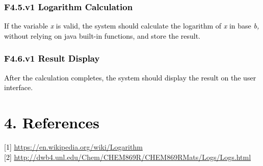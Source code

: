 \documentclass[letterpaper]{article}
\begin{document}
\subsubsection[F4.5.v1 Logarithm Calculation]{\textbf{\textcolor{black}{F4.5.v1 Logarithm Calculation}}}
\textcolor{black}{If the variable }\textit{\textcolor{black}{x}}\textcolor{black}{ is valid, the system should calculate
the logarithm of }\textit{\textcolor{black}{x}}\textcolor{black}{ in base
}\textit{\textcolor{black}{b,}}\textcolor{black}{ without relying on java built-in functions, and store the result.}

\subsubsection[F4.6.v1 Result Display]{\textbf{\textcolor{black}{F4.6.v1 Result Display}}}
\textcolor{black}{After the calculation completes, the system should display the result on the user interface.}

\section[4. References]{\textbf{\textcolor{black}{4. References}}}
\textcolor{black}{[1] }\url{https://en.wikipedia.org/wiki/Logarithm}\\
\textcolor{black}{[2] }\url{http://dwb4.unl.edu/Chem/CHEM869R/CHEM869RMats/Logs/Logs.html}


\bigskip


\bigskip


\bigskip
\end{document}
